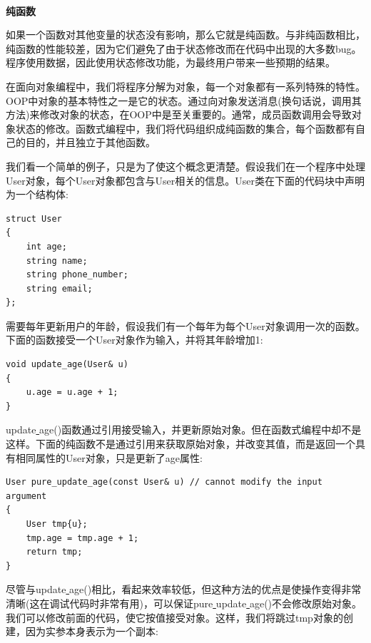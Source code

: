 \noindent\textbf{}\ \par
\textbf{纯函数} \ \par
如果一个函数对其他变量的状态没有影响，那么它就是纯函数。与非纯函数相比，纯函数的性能较差，因为它们避免了由于状态修改而在代码中出现的大多数bug。程序使用数据，因此使用状态修改功能，为最终用户带来一些预期的结果。 \par
在面向对象编程中，我们将程序分解为对象，每一个对象都有一系列特殊的特性。OOP中对象的基本特性之一是它的状态。通过向对象发送消息(换句话说，调用其方法)来修改对象的状态，在OOP中是至关重要的。通常，成员函数调用会导致对象状态的修改。函数式编程中，我们将代码组织成纯函数的集合，每个函数都有自己的目的，并且独立于其他函数。 \par
我们看一个简单的例子，只是为了使这个概念更清楚。假设我们在一个程序中处理User对象，每个User对象都包含与User相关的信息。User类在下面的代码块中声明为一个结构体: \par

\begin{lstlisting}[caption={}]
struct User
{
	int age;
	string name;
	string phone_number;
	string email;
};
\end{lstlisting}

需要每年更新用户的年龄，假设我们有一个每年为每个User对象调用一次的函数。下面的函数接受一个User对象作为输入，并将其年龄增加1: \par

\begin{lstlisting}[caption={}]
void update_age(User& u)
{
	u.age = u.age + 1;
}
\end{lstlisting}

update\underline{ }age()函数通过引用接受输入，并更新原始对象。但在函数式编程中却不是这样。下面的纯函数不是通过引用来获取原始对象，并改变其值，而是返回一个具有相同属性的User对象，只是更新了age属性: \par

\begin{lstlisting}[caption={}]
User pure_update_age(const User& u) // cannot modify the input argument
{
	User tmp{u};
	tmp.age = tmp.age + 1;
	return tmp;
}
\end{lstlisting}

尽管与update\underline{ }age()相比，看起来效率较低，但这种方法的优点是使操作变得非常清晰(这在调试代码时非常有用)，可以保证pure\underline{ }update\underline{ }age()不会修改原始对象。我们可以修改前面的代码，使它按值接受对象。这样，我们将跳过tmp对象的创建，因为实参本身表示为一个副本: \par

